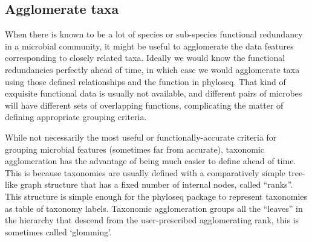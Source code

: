 \begin{knitrout}
\color{fgcolor}
\end{knitrout}


\subsection*{Agglomerate taxa}

When there is known to be a lot of
species or sub-species functional redundancy
in a microbial community,
it might be useful to agglomerate the data features
corresponding to closely related taxa.
Ideally we would know the functional redundancies perfectly ahead of time,
in which case we would agglomerate taxa using those defined relationships
and the  function in phyloseq.
That kind of exquisite functional data is usually not available,
and different pairs of microbes will have different sets of overlapping functions,
complicating the matter of defining appropriate grouping criteria.

While not necessarily the most useful or functionally-accurate
criteria for grouping microbial features
(sometimes far from accurate),
taxonomic agglomeration has the advantage of being much easier to define ahead of time.
This is because taxonomies are usually defined
with a comparatively simple tree-like graph structure
that has a fixed number of internal nodes, called ``ranks''.
This structure is simple enough for the phyloseq package
to represent taxonomies as table of taxonomy labels.
Taxonomic agglomeration groups all the ``leaves'' in the hierarchy
that descend from the user-prescribed agglomerating rank, this is sometimes called
`glomming'.

